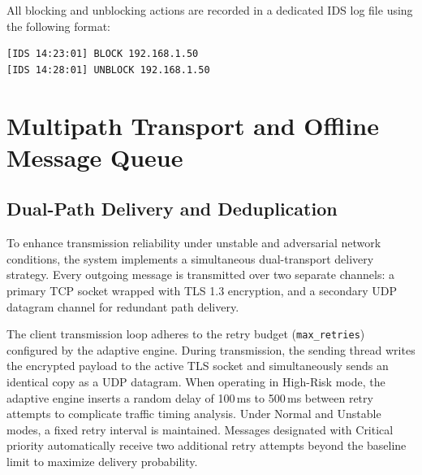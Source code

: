 \documentclass[conference]{IEEEtran}
\begin{document}
All blocking and unblocking actions are recorded in a dedicated IDS log file using the following format:
\begin{verbatim}
[IDS 14:23:01] BLOCK 192.168.1.50
[IDS 14:28:01] UNBLOCK 192.168.1.50
\end{verbatim}

\section{Multipath Transport and Offline Message Queue}
\label{sec:multipath_transport}

\subsection{Dual-Path Delivery and Deduplication}

To enhance transmission reliability under unstable and adversarial network conditions, the system implements a simultaneous dual-transport delivery strategy. Every outgoing message is transmitted over two separate channels: a primary TCP socket wrapped with TLS 1.3 encryption, and a secondary UDP datagram channel for redundant path delivery.

The client transmission loop adheres to the retry budget (\texttt{max\_retries}) configured by the adaptive engine. During transmission, the sending thread writes the encrypted payload to the active TLS socket and simultaneously sends an identical copy as a UDP datagram. When operating in High-Risk mode, the adaptive engine inserts a random delay of 100\,ms to 500\,ms between retry attempts to complicate traffic timing analysis. Under Normal and Unstable modes, a fixed retry interval is maintained. Messages designated with Critical priority automatically receive two additional retry attempts beyond the baseline limit to maximize delivery probability.
\end{document}

